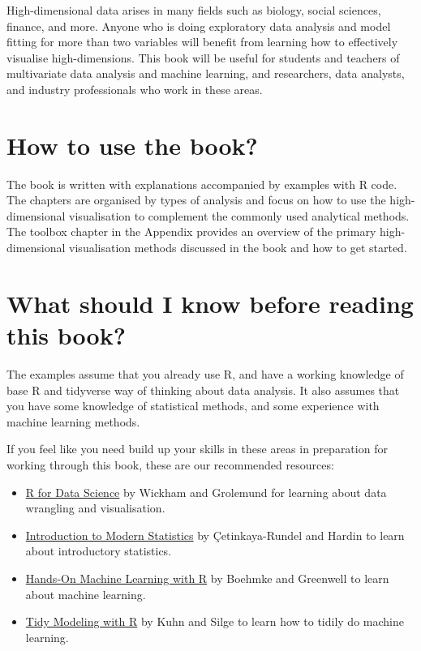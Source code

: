 \documentclass[
  letterpaper,
]{krantz}
\providecommand{\tightlist}{%
  \setlength{\itemsep}{0pt}\setlength{\parskip}{0pt}}\usepackage{longtable,booktabs,array}
\begin{document}

High-dimensional data arises in many fields such as biology, social
sciences, finance, and more. Anyone who is doing exploratory data
analysis and model fitting for more than two variables will benefit from
learning how to effectively visualise high-dimensions. This book will be
useful for students and teachers of multivariate data analysis and
machine learning, and researchers, data analysts, and industry
professionals who work in these areas.

\section*{How to use the book?}\label{how-to-use-the-book}


The book is written with explanations accompanied by examples with R
code. The chapters are organised by types of analysis and focus on how
to use the high-dimensional visualisation to complement the commonly
used analytical methods. The toolbox chapter in the Appendix provides an
overview of the primary high-dimensional visualisation methods discussed
in the book and how to get started.

\section*{What should I know before reading this
book?}\label{what-should-i-know-before-reading-this-book}


The examples assume that you already use R, and have a working knowledge
of base R and tidyverse way of thinking about data analysis. It also
assumes that you have some knowledge of statistical methods, and some
experience with machine learning methods.

If you feel like you need build up your skills in these areas in
preparation for working through this book, these are our recommended
resources:

\begin{itemize}
\tightlist
\item
  \href{https://r4ds.had.co.nz}{R for Data Science} by Wickham and
  Grolemund for learning about data wrangling and visualisation.
\item
  \href{https://openintro-ims.netlify.app}{Introduction to Modern
  Statistics} by Çetinkaya-Rundel and Hardin to learn about introductory
  statistics.
\item
  \href{https://bradleyboehmke.github.io/HOML/}{Hands-On Machine
  Learning with R} by Boehmke and Greenwell to learn about machine
  learning.
\item
  \href{https://www.tmwr.org}{Tidy Modeling with R} by Kuhn and Silge to
  learn how to tidily do machine learning.
\end{itemize}
\end{document}
